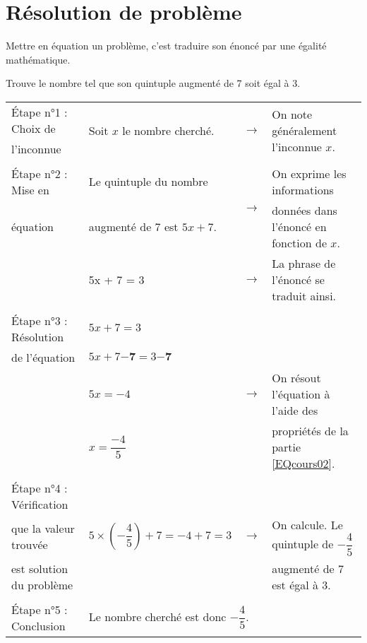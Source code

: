 \newpage

\section{Résolution de problème} 


\begin{definition}
Mettre en équation un problème, c'est traduire son énoncé par une égalité mathématique.
\end{definition}


\begin{exemple*1}

Trouve le nombre tel que son quintuple augmenté de 7 soit égal à 3.

\correction

\vspace{.5em}

\begin{tabular}{llcl}
Étape n°1 : Choix de & \multirow{2}{*}{Soit $x$ le nombre cherché.} & \multirow{2}{*}{$\longrightarrow$} & \multirow{2}{*}{On note généralement l'inconnue $x$.} \\
l'inconnue & & & \\
& & & \\
%
Étape n°2 : Mise en & Le quintuple du nombre & \multirow{2}{*}{$\longrightarrow$} & On exprime les informations \\
équation & augmenté de 7 est $5x + 7$. &  & données dans l'énoncé en fonction de $x$. \\
 & 5x + 7 = 3 & $\longrightarrow$ & La phrase de l'énoncé se traduit ainsi.\\
 & & & \\
%
Étape n°3 : Résolution  & $5x + 7=3$ &  & \\
de l'équation           & $5x + 7 \boldsymbol{-7} = 3\boldsymbol{-7}$ &  & \\
                        & $5x=-4$ & $\longrightarrow$ & On résout l'équation à l'aide des \\
                        & $x=\dfrac{-4}{5}$ & & propriétés de la partie \ref{EQcours02}.\\
 & & & \\
%
Étape n°4 : Vérification & &  &  \\
que la valeur trouvée & $5 \times \left(-\dfrac{4}{5}\right)+7 = -4 +7=3 $ & $\longrightarrow$ & On calcule. Le quintuple de $-\dfrac{4}{5}$ \\
est solution du problème & &  & augmenté de 7 est égal à 3. \\
 & & & \\
%
Étape n°5 : Conclusion & \multicolumn{3}{l}{Le nombre cherché est donc $-\dfrac{4}{5}$.} \\
\end{tabular}
 
\end{exemple*1}